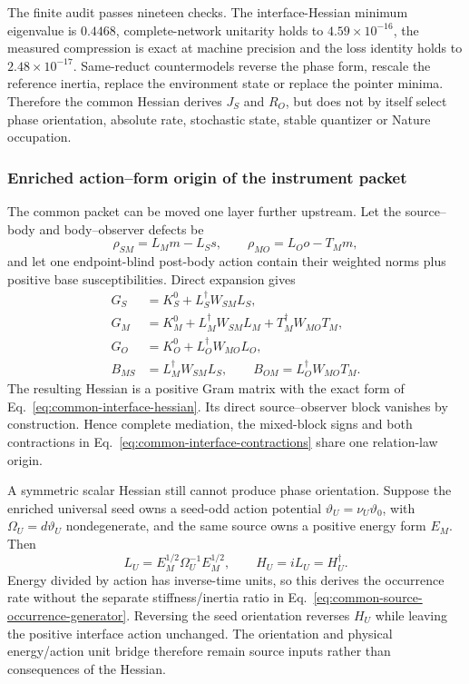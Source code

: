 \documentclass[11pt]{article}
\begin{document}
The finite audit passes nineteen checks. The interface-Hessian minimum
eigenvalue is \(0.4468\), complete-network unitarity holds to
\(4.59\times10^{-16}\), the measured compression is exact at machine
precision and the loss identity holds to \(2.48\times10^{-17}\). Same-reduct
countermodels reverse the phase form, rescale the reference inertia, replace
the environment state or replace the pointer minima. Therefore the common
Hessian derives \(J_S\) and \(R_O\), but does not by itself select phase
orientation, absolute rate, stochastic state, stable quantizer or Nature
occupation.

\subsubsection{Enriched action--form origin of the instrument packet}

The common packet can be moved one layer further upstream.  Let the
source--body and body--observer defects be
\[
 \rho_{SM}=L_Mm-L_Ss,\qquad
 \rho_{MO}=L_Oo-T_Mm,
\]
and let one endpoint-blind post-body action contain their weighted norms plus
positive base susceptibilities.  Direct expansion gives
\begin{align}
 G_S&=K_S^0+L_S^\dagger W_{SM}L_S,\nonumber\\
 G_M&=K_M^0+L_M^\dagger W_{SM}L_M
             +T_M^\dagger W_{MO}T_M,\nonumber\\
 G_O&=K_O^0+L_O^\dagger W_{MO}L_O,\nonumber\\
 B_{MS}&=L_M^\dagger W_{SM}L_S,\qquad
 B_{OM}=L_O^\dagger W_{MO}T_M.
 \label{eq:enriched-relation-hessian-blocks}
\end{align}
The resulting Hessian is a positive Gram matrix with the exact form of
Eq.~\eqref{eq:common-interface-hessian}.  Its direct source--observer block
vanishes by construction.  Hence complete mediation, the mixed-block signs
and both contractions in
Eq.~\eqref{eq:common-interface-contractions} share one relation-law origin.

A symmetric scalar Hessian still cannot produce phase orientation.  Suppose
the enriched universal seed owns a seed-odd action potential
\(\vartheta_U=\nu_U\vartheta_0\), with
\(\Omega_U=d\vartheta_U\) nondegenerate, and the same source owns a positive
energy form \(E_M\).  Then
\begin{equation}
 L_U=E_M^{1/2}\Omega_U^{-1}E_M^{1/2},\qquad
 H_U=iL_U=H_U^\dagger.
 \label{eq:energy-action-occurrence-generator}
\end{equation}
Energy divided by action has inverse-time units, so this derives the
occurrence rate without the separate stiffness/inertia ratio in
Eq.~\eqref{eq:common-source-occurrence-generator}.  Reversing the seed
orientation reverses \(H_U\) while leaving the positive interface action
unchanged.  The orientation and physical energy/action unit bridge therefore
remain source inputs rather than consequences of the Hessian.
\end{document}

